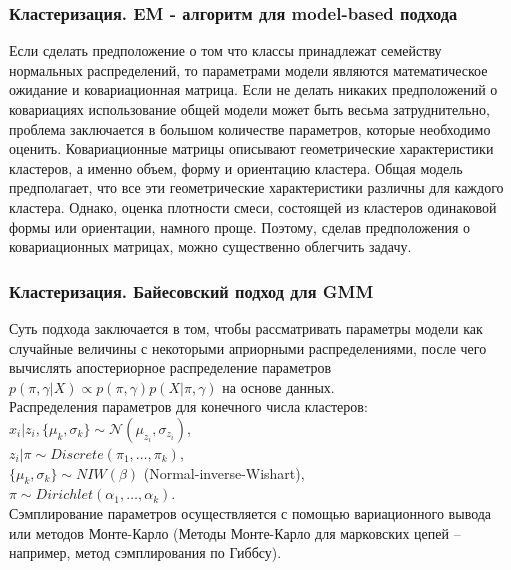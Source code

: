 \documentclass[notheorems, handout]{beamer}
\begin{document}
	\begin{frame}
	\frametitle{Кластеризация. EM - алгоритм для model-based подхода}
		Если сделать предположение о том что классы принадлежат семейству нормальных распределений, то параметрами модели являются математическое ожидание и ковариационная матрица. Если не делать никаких предположений о ковариациях использование общей модели может быть весьма затруднительно, проблема заключается в большом количестве параметров, которые необходимо оценить. Ковариационные матрицы описывают геометрические характеристики кластеров, а именно объем, форму и ориентацию кластера. Общая модель предполагает, что все эти геометрические характеристики различны для каждого кластера. Однако, оценка плотности смеси, состоящей из кластеров одинаковой формы или ориентации, намного проще. Поэтому, сделав предположения о ковариационных матрицах, можно существенно облегчить задачу.
	\end{frame}
	
	\begin{frame}
	\frametitle{Кластеризация. Байесовский подход для GMM}
	Суть подхода заключается в том, чтобы рассматривать параметры модели как случайные величины с некоторыми априорными распределениями, после чего вычислять апостериорное распределение параметров $p(\pi,\gamma|X)\propto p(\pi,\gamma)p(X|\pi,\gamma)$ на основе данных.\\
	Распределения параметров для конечного числа кластеров:\\
	$x_i|z_i,\{\mu_k, \sigma_k\}\sim\mathcal{N}(\mu_{z_i}, \sigma_{z_i})$,\\
	$z_i|\pi\sim Discrete(\pi_1,\ldots,\pi_k)$,\\
	$\{\mu_k, \sigma_k\}\sim NIW(\beta)$ (Normal-inverse-Wishart),\\
	$\pi\sim Dirichlet(\alpha_1,\ldots,\alpha_k)$.\\
	Сэмплирование параметров осуществляется с помощью вариационного вывода или методов Монте-Карло (Методы Монте-Карло для марковских цепей -- например, метод сэмплирования по Гиббсу).
	\end{frame}
	
\end{document}
